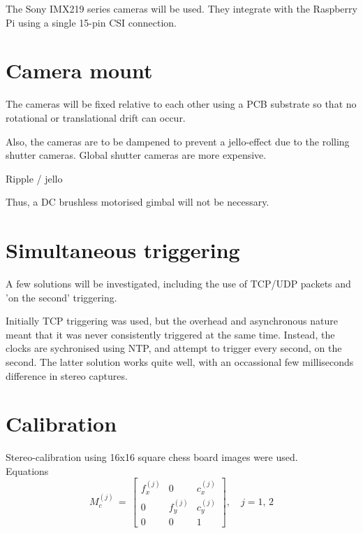 The Sony IMX219 series cameras will be used. They integrate with the Raspberry Pi using a single 15-pin CSI connection.

\section{Camera mount}

The cameras will be fixed relative to each other using a PCB substrate so that no rotational or translational drift can occur.

Also, the cameras are to be dampened to prevent a jello-effect due to the rolling shutter cameras. Global shutter cameras are more expensive.

Ripple / jello

Thus, a DC brushless motorised gimbal will not be necessary.

\section{Simultaneous triggering}

A few solutions will be investigated, including the use of TCP/UDP packets and 'on the second' triggering.

Initially TCP triggering was used, but the overhead and asynchronous nature meant that it was never consistently triggered at the same time. Instead, the clocks are sychronised using NTP, and attempt to trigger every second, on the second. The latter solution works quite well, with an occassional few milliseconds difference in stereo captures.

\section{Calibration}

Stereo-calibration using 16x16 square chess board images were used.\\

Equations\\

\begin{equation}\label{eq:cm}
M_c^{(j)}\,=\,\begin{bmatrix}
{f_x^{(j)}} & {0} & {c_x^{(j)}}\\
{0} & {f_y^{(j)}} & {c_y^{(j)}}\\
{0} & {0} & {1}
\end{bmatrix},\quad j = 1,\, 2
\end{equation}

